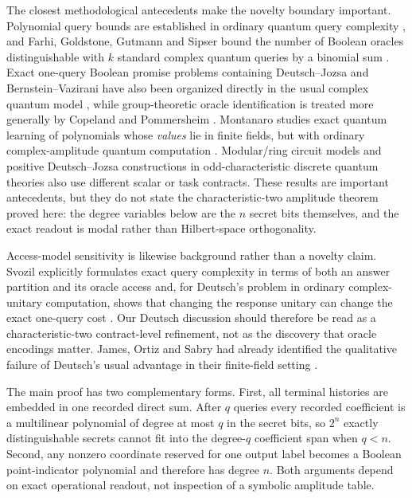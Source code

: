 \documentclass[11pt]{article}
\begin{document}
The closest methodological antecedents make the novelty boundary important. Polynomial query bounds are established in ordinary quantum query complexity \cite{Beals2001}, and Farhi, Goldstone, Gutmann and Sipser bound the number of Boolean oracles distinguishable with $k$ standard complex quantum queries by a binomial sum \cite{Farhi1999}. Exact one-query Boolean promise problems containing Deutsch--Jozsa and Bernstein--Vazirani have also been organized directly in the usual complex quantum model \cite{Combarro2021}, while group-theoretic oracle identification is treated more generally by Copeland and Pommersheim \cite{Copeland2021}. Montanaro studies exact quantum learning of polynomials whose \emph{values} lie in finite fields, but with ordinary complex-amplitude quantum computation \cite{Montanaro2012}. Modular/ring circuit models \cite{deBeaudrap2014} and positive Deutsch--Jozsa constructions in odd-characteristic discrete quantum theories \cite{Hanson2011,Tai2019} also use different scalar or task contracts. These results are important antecedents, but they do not state the characteristic-two amplitude theorem proved here: the degree variables below are the $n$ secret bits themselves, and the exact readout is modal rather than Hilbert-space orthogonality.

Access-model sensitivity is likewise background rather than a novelty claim. Svozil explicitly formulates exact query complexity in terms of both an answer partition and its oracle access and, for Deutsch's problem in ordinary complex-unitary computation, shows that changing the response unitary can change the exact one-query cost \cite{Svozil2026}. Our Deutsch discussion should therefore be read as a characteristic-two contract-level refinement, not as the discovery that oracle encodings matter. James, Ortiz and Sabry had already identified the qualitative failure of Deutsch's usual advantage in their finite-field setting \cite{James2011}.

The main proof has two complementary forms. First, all terminal histories are embedded in one recorded direct sum. After $q$ queries every recorded coefficient is a multilinear polynomial of degree at most $q$ in the secret bits, so $2^n$ exactly distinguishable secrets cannot fit into the degree-$q$ coefficient span when $q<n$. Second, any nonzero coordinate reserved for one output label becomes a Boolean point-indicator polynomial and therefore has degree $n$. Both arguments depend on exact operational readout, not inspection of a symbolic amplitude table.
\end{document}
